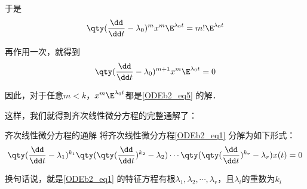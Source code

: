 于是
\begin{equation}
\qty(\frac{\dd}{\dd t}-\lambda_0)^mx^m\E^{\lambda_0 t}=m!\E^{\lambda_0 t}
\end{equation}

再作用一次，就得到
\begin{equation}
\qty(\frac{\dd}{\dd t}-\lambda_0)^{m+1}x^m\E^{\lambda_0 t}=0
\end{equation}

因此，对于任意$m<k$，$x^m\E^{\lambda_0 t}$都是\autoref{ODEb2_eq5} 的解．

这样，我们就得到齐次线性微分方程的完整通解了：

\begin{theorem}{齐次线性微分方程的通解}
将齐次线性微分方程\autoref{ODEb2_eq1} 分解为如下形式：
\begin{equation}\label{ODEb2_eq6}
\qty(\frac{\dd}{\dd t}-\lambda_1)^{k_1}\qty(\qty(\frac{\dd}{\dd t})^{k_2}-\lambda_2)\cdots\qty(\qty(\frac{\dd}{\dd t})^{k_r}-\lambda_r)x(t)=0
\end{equation}

换句话说，就是\autoref{ODEb2_eq1} 的特征方程有根$\lambda_1, \lambda_2, \cdots, \lambda_r$，且$\lambda_i$的重数为$k_i$




\end{theorem}











